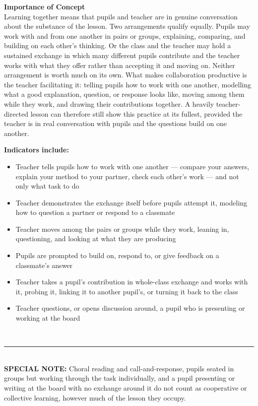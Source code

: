 \documentclass[10pt,a4paper]{article}
\newcommand{\twopane}[2]{%
  \noindent
  \begin{minipage}[t]{0.475\linewidth}\RaggedRight
    {\bfseries\small Importance of Concept}\\[1.4mm]
    \footnotesize #1 \normalsize
  \end{minipage}\hfill
  \begin{minipage}[t]{0.475\linewidth}\RaggedRight
    {\bfseries\small Indicators include:}\\[0.6mm]
    #2
  \end{minipage}\\[2mm]}
\newcommand{\specialnote}[1]{%
  \noindent\textcolor{trule}{\rule{\linewidth}{0.4pt}}\\[1.2mm]
  {\footnotesize\textbf{SPECIAL NOTE:} #1}\\[2mm]}
\begin{document}
\twopane{%
Learning together means that pupils and teacher are in genuine conversation about the substance of the
lesson. Two arrangements qualify equally. Pupils may work with and from one another in pairs or groups,
explaining, comparing, and building on each other's thinking. Or the class and the teacher may hold a
sustained exchange in which many different pupils contribute and the teacher works with what they offer
rather than accepting it and moving on. Neither arrangement is worth much on its own. What makes
collaboration productive is the teacher facilitating it: telling pupils how to work with one another,
modelling what a good explanation, question, or response looks like, moving among them while they work,
and drawing their contributions together. A heavily teacher-directed lesson can therefore still show this practice at its fullest, provided the teacher is in real conversation with pupils and the questions build on one
another. 
}{%
\footnotesize
\begin{itemize}
  \item Teacher tells pupils how to work with one another --- compare your answers, explain your method to
        your partner, check each other's work --- and not only what task to do
    \item Teacher demonstrates the exchange itself before pupils attempt it, modeling how to question a
        partner or respond to a classmate
  \item Teacher moves among the pairs or groups while they work, leaning in, questioning, and looking at
        what they are producing
  \item Pupils are prompted to build on, respond to, or give feedback on a classmate's answer
  \item Teacher takes a pupil's contribution in whole-class exchange and works with it, probing it, linking
        it to another pupil's, or turning it back to the class
  \item Teacher questions, or opens discussion around, a pupil who is presenting or working at the board
\end{itemize}
\normalsize
}
 
\specialnote{Choral reading and call-and-response, pupils seated in groups but working through the task
individually, and a pupil presenting or writing at the board with no exchange around it do not count as
cooperative or collective learning, however much of the lesson they occupy.}
 
\end{document}
